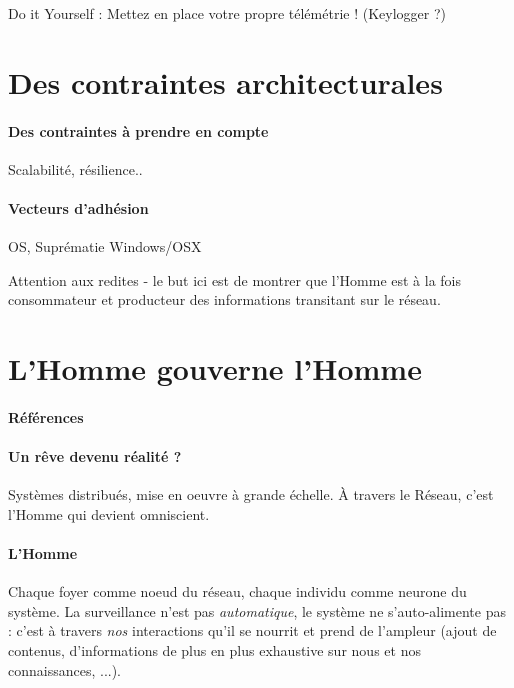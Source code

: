 Do it Yourself : Mettez en place votre propre télémétrie ! (Keylogger ?)

\section{Des contraintes architecturales}
\paragraph{Des contraintes à prendre en compte} Scalabilité, résilience..
\paragraph{Vecteurs d'adhésion} OS, Suprématie Windows/OSX

Attention aux redites - le but ici est de montrer que l'Homme est à la fois
consommateur et producteur des informations transitant sur le réseau.

\section{L'Homme gouverne l'Homme}
\paragraph{Références} \cite{GhostInTheShell}

\paragraph{Un rêve devenu réalité ?} Systèmes distribués, mise en oeuvre à grande échelle.
À travers le Réseau, c'est l'Homme qui devient omniscient.

\paragraph{L'Homme} Chaque foyer comme noeud du réseau, chaque individu comme neurone du
système. La surveillance n'est pas \emph{automatique}, le système ne s'auto-alimente pas :
c'est à travers \emph{nos} interactions qu'il se nourrit et prend de l'ampleur (ajout de 
contenus, d'informations de plus en plus exhaustive sur nous et nos connaissances, ...).